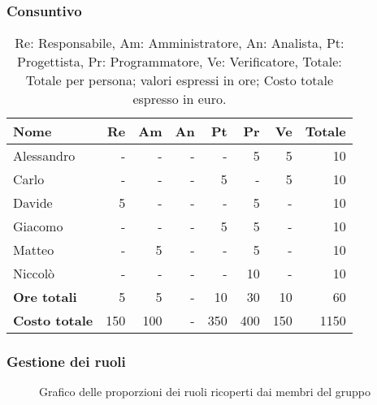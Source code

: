 \subsubsection{Consuntivo}
\begin{table}[H]
	\centering
	\begin{tabular}{l|r|r|r|r|r|r|r}
		\textbf{Nome}         & \textbf{Re} & \textbf{Am} & \textbf{An} & \textbf{Pt} & \textbf{Pr} & \textbf{Ve} & \textbf{Totale} \\
		\hline
		Alessandro            & -           & -           & -           & -           & 5           & 5           & 10              \\
		Carlo                 & -           & -           & -           & 5           & -           & 5           & 10              \\
		Davide                & 5           & -           & -           & -           & 5           & -           & 10              \\
		Giacomo               & -           & -           & -           & 5           & 5           & -           & 10              \\
		Matteo                & -           & 5           & -           & -           & 5           & -           & 10              \\
		Niccolò               & -           & -           & -           & -           & 10           & -           & 10              \\
		\hline
		\textbf{Ore totali}   & 5           & 5           & -           & 10          & 30          & 10          & 60              \\
		\textbf{Costo totale} & 150         & 100         & -           & 350         & 400         & 150         & 1150
	\end{tabular}
	\caption{Re: Responsabile, Am: Amministratore, An: Analista, Pt: Progettista,
		Pr: Programmatore, Ve: Verificatore, Totale: Totale per persona; valori espressi in ore; Costo totale espresso in euro.}
\end{table}

\subsubsection{Gestione dei ruoli}
\begin{figure}[h]
	\centering
	\caption{Grafico delle proporzioni dei ruoli ricoperti dai membri del gruppo}
\end{figure}

